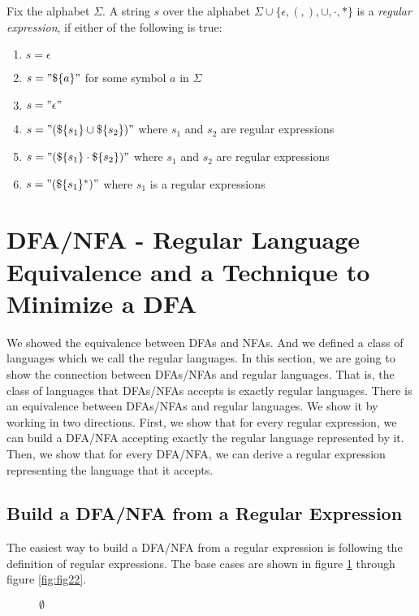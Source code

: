 \documentclass[11pt]{article}
\begin{document}
\begin{definition} \label{def:def19}
Fix the alphabet $\Sigma$. A string $s$ over the alphabet
$\Sigma \cup \{\epsilon,(,),\cup,\cdot,\ast\}$ is a \emph{regular
expression}, if either of the following is true:
\begin{enumerate}
\item $s = \epsilon$
\item $s = "\$\{a\}"$ for some symbol $a$ in $\Sigma$
\item $s = "\epsilon"$
\item $s = "(\$\{s_1\} \cup \$\{s_2\})"$ where $s_1$ and $s_2$ are regular
expressions
\item $s = "(\$\{s_1\} \cdot \$\{s_2\})"$ where $s_1$ and $s_2$ are regular
expressions
\item $s = "(\$\{s_1\}^\ast)"$ where $s_1$ is a regular expressions
\end{enumerate}
\end{definition}

\section{DFA/NFA - Regular Language Equivalence and a Technique to Minimize a DFA}

We showed the equivalence between DFAs and NFAs. And we defined a class of
languages which we call the regular languages. In this section, we are going
to show the connection between DFAs/NFAs and regular languages. That is, the
class of languages that DFAs/NFAs accepts is exactly regular languages. There
is an equivalence between DFAs/NFAs and regular languages. We show it by
working in two directions. First, we show that for every regular expression,
we can build a DFA/NFA accepting exactly the regular language represented by
it. Then, we show that for every DFA/NFA, we can derive a regular expression
representing the language that it accepts.

\subsection{Build a DFA/NFA from a Regular Expression}

The easiest way to build a DFA/NFA from a regular expression is following
the definition of regular expressions. The base cases are shown in figure
\ref{fig:fig20} through figure \ref{fig:fig22}.

\begin{figure}[ht]
    \centering
    \caption{$\emptyset$}
    \label{fig:fig20}
\end{figure}
\end{document}
